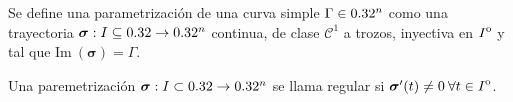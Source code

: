 
\begin{definition}
    Se define una parametrizaci\'on de una curva simple $\Gamma\in0.32^n$ como una trayectoria $\boldsymbol{\sigma}:I\subseteq0.32\to0.32^n$ continua, de clase $\mathcal{C}^1$ a trozos, inyectiva en ${\kern0ptI}^{\mathrm{o}}$ y tal que  $\text{Im}\:(\boldsymbol{\sigma})=\Gamma$.
\end{definition}

\begin{definition}
    Una paremetrizaci\'on $\boldsymbol{\sigma}:I\subset0.32\to0.32^n$ se llama regular si $\boldsymbol{\sigma}'(t)\neq0 \: \forall t\in{\kern0ptI}^{\mathrm{o}}$.
\end{definition}